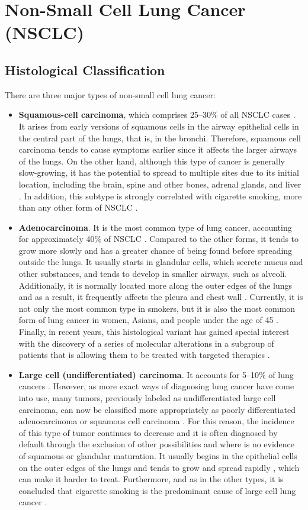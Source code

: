 \section{Non-Small Cell Lung Cancer (NSCLC)}

\subsection{Histological Classification}

There are three major types of non-small cell lung cancer:
\begin{itemize}
    \item \textbf{Squamous-cell carcinoma}, which comprises 25–30\% of all NSCLC cases \cite{NSCLC}. It arises from early versions of squamous cells in the airway epithelial cells in the central part of the lungs, that is, in the bronchi. Therefore, squamous cell carcinoma tends to cause symptoms earlier since it affects the larger airways of the lungs. On the other hand, although this type of cancer is generally slow-growing, it has the potential to spread to multiple sites due to its initial location, including the brain, spine and other bones, adrenal glands, and liver \cite{NSCLC_metastases}. In addition, this subtype is strongly correlated with cigarette smoking, more than any other form of NSCLC \cite{Tobacco, Smoking}.
    \item \textbf{Adenocarcinoma}. It is the most common type of lung cancer, accounting for approximately 40\% of NSCLC \cite{NSCLC}. Compared to the other forms, it tends to grow more slowly and has a greater chance of being found before spreading outside the lungs. It usually starts in glandular cells, which secrete mucus and other substances, and tends to develop in smaller airways, such as alveoli. Additionally, it is normally located more along the outer edges of the lungs and as a result, it frequently affects the pleura and chest wall \cite{ALA}. Currently, it is not only the most common type in smokers, but it is also the most common form of lung cancer in women, Asians, and people under the age of 45 \cite{AD_survival}. Finally, in recent years, this histological variant has gained special interest with the discovery of a series of molecular alterations in a subgroup of patients that is allowing them to be treated with targeted therapies \cite{AD_savini}.
    \item \textbf{Large cell (undifferentiated) carcinoma}. It accounts for 5–10\% of lung cancers \cite{NSCLC}. However, as more exact ways of diagnosing lung cancer have come into use, many tumors, previously labeled as undifferentiated large cell carcinoma, can now be classified more appropriately as poorly differentiated adenocarcinoma or squamous cell carcinoma \cite{LCC}. For this reason, the incidence of this type of tumor continues to decrease and it is often diagnosed by default through the exclusion of other possibilities and where is no evidence of squamous or glandular maturation. It usually begins in the epithelial cells on the outer edges of the lungs and tends to grow and spread rapidly \cite{LCC_bio}, which can make it harder to treat. Furthermore, and as in the other types, it is concluded that cigarette smoking is the predominant cause of large cell lung cancer \cite{LCC_smoking}.

\end{itemize}
